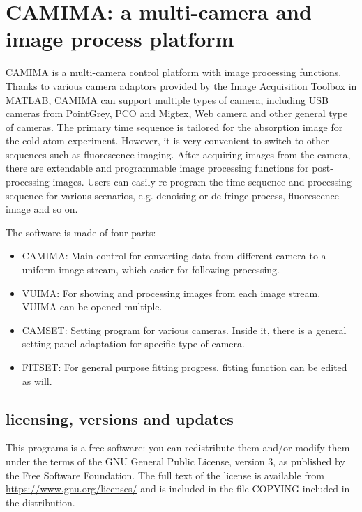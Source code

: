 \section{CAMIMA: a multi-camera and image process platform}
\label{sec:camima}

CAMIMA is a multi-camera control platform with image processing functions. Thanks to various camera adaptors provided by the Image Acquisition Toolbox in MATLAB, CAMIMA can support multiple types of camera, including USB cameras from PointGrey, PCO and Migtex, Web camera and other general type of cameras. The primary time sequence is tailored for the absorption image for the cold atom experiment. However, it is very convenient to switch to other sequences such as fluorescence imaging. After acquiring images from the camera, there are extendable and programmable image processing functions for post-processing images. Users can easily re-program the time sequence and processing sequence for various scenarios, e.g. denoising or de-fringe process, fluorescence image and so on.

The software is made of four parts: 
\begin{itemize}[noitemsep,topsep=0pt]
\item CAMIMA: Main control for converting data from different camera to a uniform image stream, which easier for following processing.
\item VUIMA: For showing and processing images from each image stream. VUIMA can be opened multiple.
\item CAMSET: Setting program for various cameras. Inside it, there is a general setting panel adaptation for specific type of camera.
\item FITSET: For general purpose fitting progress. fitting function can be edited as will.
\end{itemize}

\subsection{licensing, versions and updates}
This programs is a free software: you can redistribute them and/or modify them under the terms of the GNU General Public License, version 3, as published by the Free Software Foundation. The full text of the license is available from \href{https://www.gnu.org/licenses/}{https://www.gnu.org/licenses/} and is included in the file COPYING included in the distribution.


